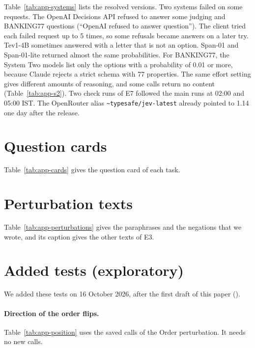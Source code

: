 \documentclass[11pt]{article}
\begin{document}
Table~\ref{tab:app-systems} lists the resolved versions. Two systems failed on some requests. The OpenAI Decisions API refused to answer some judging and BANKING77 questions (``OpenAI refused to answer question''). The client tried each failed request up to 5 times, so some refusals became answers on a later try. Tev1-4B sometimes answered with a letter that is not an option. Span-01 and Span-01-lite returned almost the same probabilities. For BANKING77, the System Two models list only the options with a probability of 0.01 or more, because Claude rejects a strict schema with 77 properties. The same effort setting gives different amounts of reasoning, and some calls return no content (Table~\ref{tab:app-s2}). Two check runs of E7 followed the main runs at 02:00 and 05:00 IST. The OpenRouter alias \texttt{\textasciitilde typesafe/jev-latest} already pointed to 1.14 one day after the release.



\section{Question cards}
\label{app:cards}

Table~\ref{tab:app-cards} gives the question card of each task.



\section{Perturbation texts}
\label{app:perturbations}

Table~\ref{tab:app-perturbations} gives the paraphrases and the negations that we wrote, and its caption gives the other texts of E3.



\section{Added tests (exploratory)}
\label{app:added}

We added these tests on 16 October 2026, after the first draft of this paper (\addedTimeText).

\paragraph{Direction of the order flips.} Table~\ref{tab:app-position} uses the saved calls of the Order perturbation. It needs no new calls.
\end{document}
